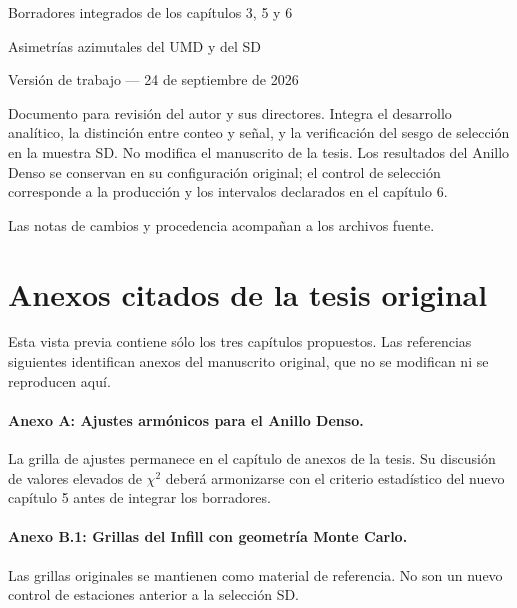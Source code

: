 \documentclass[spanish,a4paper,12pt]{article}
\begin{document}
\hypersetup{pageanchor=false}
\begin{titlepage}
\centering
\vspace*{2cm}
{\LARGE Borradores integrados de los capítulos 3, 5 y 6\par}
\vspace{1cm}
{\Large Asimetrías azimutales del UMD y del SD\par}
\vspace{1cm}
{\large Versión de trabajo --- 24 de septiembre de 2026\par}
\vspace{1cm}
\begin{minipage}{0.85\textwidth}
Documento para revisión del autor y sus directores. Integra el desarrollo
analítico, la distinción entre conteo y señal, y la verificación del sesgo
de selección en la muestra SD. No modifica el manuscrito de la tesis.
Los resultados del Anillo Denso se conservan en su configuración original;
el control de selección corresponde a la producción y los intervalos
declarados en el capítulo 6.
\end{minipage}
\vfill
Las notas de cambios y procedencia acompañan a los archivos fuente.
\end{titlepage}
\hypersetup{pageanchor=true}
\tableofcontents
\clearpage
{}
\setcounter{section}{2}

\clearpage
\setcounter{section}{4}

\clearpage

\clearpage
\section*{Anexos citados de la tesis original}
Esta vista previa contiene sólo los tres capítulos propuestos. Las
referencias siguientes identifican anexos del manuscrito original, que
no se modifican ni se reproducen aquí.
\makeatletter\def\@currentlabel{A}\makeatother
\label{anexo:ajustes_anillo_denso}
\paragraph*{Anexo A: Ajustes armónicos para el Anillo Denso.}
La grilla de ajustes permanece en el capítulo de anexos de la tesis.
Su discusión de valores elevados de $\chi^2$ deberá armonizarse con el
criterio estadístico del nuevo capítulo 5 antes de integrar los borradores.
\makeatletter\def\@currentlabel{B.1}\makeatother
\label{anexo:ajustes_infill_mc}
\paragraph*{Anexo B.1: Grillas del Infill con geometría Monte Carlo.}
Las grillas originales se mantienen como material de referencia. No son
un nuevo control de estaciones anterior a la selección SD.
\clearpage
\printbibliography[heading=bibintoc,title={Referencias}]
\end{document}
